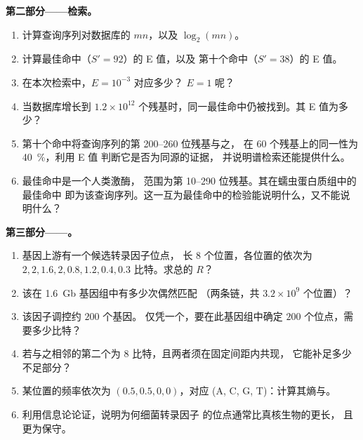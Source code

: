 \begin{problem}
\medskip
\noindent\textbf{第二部分——检索。}
\begin{enumerate}[resume]
  \item 计算查询序列对数据库的 $mn$，以及
        $\log_{2}(mn)$。
  \item 计算最佳命中（$S' = 92$）的 E 值，以及
        第十个命中（$S' = 38$）的 E 值。
  \item 在本次检索中，$E = 10^{-3}$ 对应多少？
        $E = 1$ 呢？
  \item 当数据库增长到
        $1.2\times 10^{12}$ 个残基时，同一最佳命中仍被找到。其 E 值为多少？
  \item 第十个命中将查询序列的第 200--260 位残基与之，
        在 $60$ 个残基上的同一性为 \qty{40}{\%}，利用 E 值
        判断它是否为同源的证据，
        并说明谱检索还能提供什么。
  \item 最佳命中是一个人类激酶，
        范围为第 10--290 位残基。其在蠕虫蛋白质组中的最佳命中
        即为该查询序列。这一互为最佳命中的检验能说明什么，又不能说明什么？
\end{enumerate}

\medskip
\noindent\textbf{第三部分——。}
\begin{enumerate}[resume]
  \item 基因上游有一个候选转录因子位点，
        长 8 个位置，各位置的依次为
        $2, 2, 1.6, 2, 0.8, 1.2, 0.4, 0.3$ 比特。求总的 $R$？
  \item 该在 \qty{1.6}{Gb} 基因组中有多少次偶然匹配
        （两条链，共 $3.2\times 10^{9}$
        个位置）？
  \item 该因子调控约 $200$ 个基因。
        仅凭一个，要在此基因组中确定 $200$ 个位点，需要多少比特？
  \item 若与之相邻的第二个为
        $8$ 比特，且两者须在固定间距内共现，
        它能补足多少不足部分？
  \item 某位置的频率依次为 $(0.5, 0.5, 0, 0)$，对应 (A, C, G,
        T)：计算其熵与。
  \item 利用信息论论证，说明为何细菌转录因子
        的位点通常比真核生物的更长，
        且更为保守。
\end{enumerate}


\end{problem}
